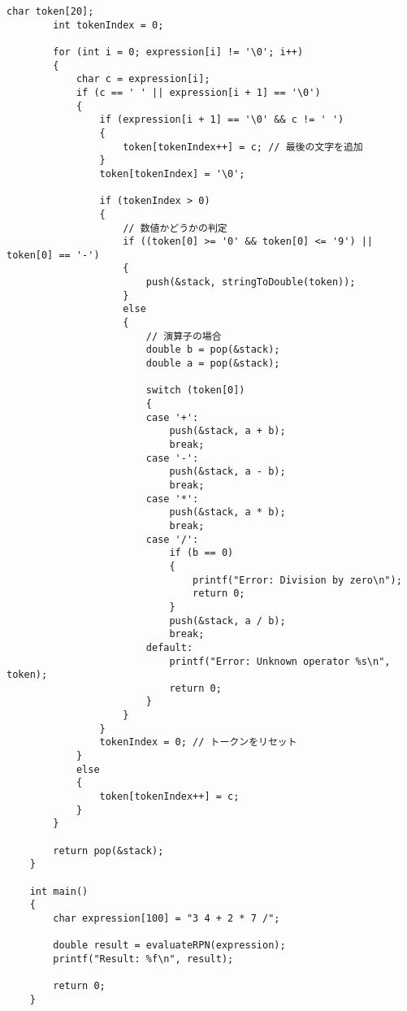 \documentclass{ltjsarticle}
\begin{document}
\begin{lstlisting}[frame=single, lineskip=-5pt]
        char token[20];
        int tokenIndex = 0;
    
        for (int i = 0; expression[i] != '\0'; i++)
        {
            char c = expression[i];
            if (c == ' ' || expression[i + 1] == '\0')
            {
                if (expression[i + 1] == '\0' && c != ' ')
                {
                    token[tokenIndex++] = c; // 最後の文字を追加
                }
                token[tokenIndex] = '\0';
    
                if (tokenIndex > 0)
                {
                    // 数値かどうかの判定
                    if ((token[0] >= '0' && token[0] <= '9') || token[0] == '-')
                    {
                        push(&stack, stringToDouble(token));
                    }
                    else
                    {
                        // 演算子の場合
                        double b = pop(&stack);
                        double a = pop(&stack);
    
                        switch (token[0])
                        {
                        case '+':
                            push(&stack, a + b);
                            break;
                        case '-':
                            push(&stack, a - b);
                            break;
                        case '*':
                            push(&stack, a * b);
                            break;
                        case '/':
                            if (b == 0)
                            {
                                printf("Error: Division by zero\n");
                                return 0;
                            }
                            push(&stack, a / b);
                            break;
                        default:
                            printf("Error: Unknown operator %s\n", token);
                            return 0;
                        }
                    }
                }
                tokenIndex = 0; // トークンをリセット
            }
            else
            {
                token[tokenIndex++] = c;
            }
        }
    
        return pop(&stack);
    }
    
    int main()
    {
        char expression[100] = "3 4 + 2 * 7 /";
    
        double result = evaluateRPN(expression);
        printf("Result: %f\n", result);
    
        return 0;
    }
\end{lstlisting}
\end{document}
